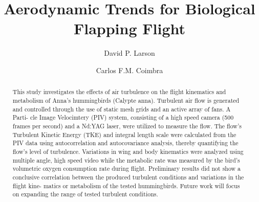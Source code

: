 \documentclass[10pt]{llncs}
\title{Aerodynamic Trends for Biological Flapping Flight}
\author{
    David P. Larson
    \and 
    Carlos F.M. Coimbra
}
\institute{
    \textit{School of Engineering, University of California, Merced }
    \\[0.25cm]
    Summer 2010
}
\begin{document}
\maketitle

\begin{abstract}
This study investigates the effects of air turbulence on the flight kinematics and metabolism of Anna’s hummingbirds (Calypte anna). Turbulent air flow is generated and controlled through the use of static mesh grids and an active array of fans. A Parti- cle Image Velocimtery (PIV) system, consisting of a high speed camera (500 frames per second) and a Nd:YAG laser, were utilized to measure the flow. The flow’s Turbulent Kinetic Energy (TKE) and integral length scale were calculated from the PIV data using autocorrelation and autocovariance analysis, thereby quantifying the flow’s level of turbulence. Variations in wing and body kinematics were analyzed using multiple angle, high speed video while the metabolic rate was measured by the bird’s volumetric oxygen consumption rate during flight. Preliminary results did not show a conclusive correlation between the produced turbulent conditions and variations in the flight kine- matics or metabolism of the tested hummingbirds. Future work will focus on expanding the range of tested turbulent conditions.
\end{abstract}
\end{document}

